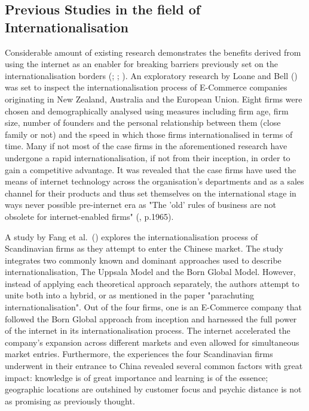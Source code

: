 \documentclass[11pt,a4paper]{article}
\begin{document}
\subsection{Previous Studies in the field of Internationalisation}
\label{prev_studies}
  \vspace{-5mm}
Considerable amount of existing research demonstrates the benefits derived from using the internet as an enabler for breaking barriers previously set on the internationalisation borders (\cite{chaiAncientModernCross2004}; \cite{shneorInternetenabledInternationalizationProcess2008}; \cite{areniusRapidInternationalisationEnabled2005}). %
An exploratory research by Loane and Bell (\citeyear{loaneCrossnationalComparisonInternationalisation2002}) was set to inspect the internationalisation process of E-Commerce companies originating in New Zealand, Australia and the European Union. Eight firms were chosen and demographically analysed using measures including firm age, firm size, number of founders and the personal relationship between them (close family or not) and the speed in which those firms internationalised in terms of time. Many if not most of the case firms in the aforementioned research have undergone a rapid internationalisation, if not from their inception, in order to gain a competitive advantage. It was revealed that the case firms have used the means of internet technology across the organisation's departments and as a sales channel for their products and thus set themselves on the international stage in ways never possible pre-internet era as "The 'old' rules of business are not obsolete for internet-enabled firms" (\cite{loaneCrossnationalComparisonInternationalisation2002}, p.1965).   \par 
A study by Fang et al.\ (\citeyear{fangParachutingInternationalizationStudy2017}) explores the internationalisation process of Scandinavian firms as they attempt to enter the Chinese market. The study integrates two commonly known and dominant approaches used to describe internationalisation, The Uppsala Model and the Born Global Model. However, instead of applying each theoretical approach separately, the authors attempt to unite both into a hybrid, or as mentioned in the paper "parachuting internationalisation". Out of the four firms, one is an E-Commerce company that followed the Born Global approach from inception and harnessed the full power of the internet in its internationalisation process. The internet accelerated the company's expansion across different markets and even allowed for simultaneous market entries. Furthermore, the experiences the four Scandinavian firms underwent in their entrance to China revealed several common factors with great impact: knowledge is of great importance and learning is of the essence; geographic locations are outshined by customer focus and psychic distance is not as promising as previously thought. \par
\end{document}

